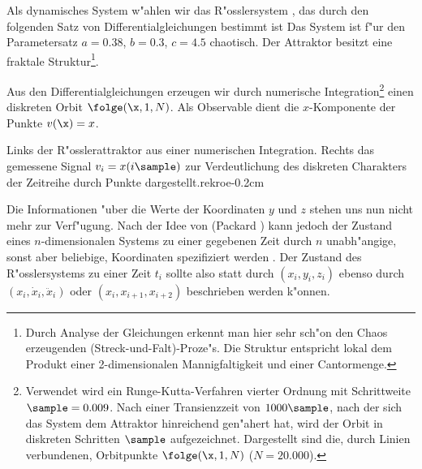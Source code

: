 Als dynamisches System w"ahlen wir das R"osslersystem \cite{Roessler76}, das durch den folgenden Satz von
Differentialgleichungen bestimmt ist
Das System ist f"ur den Parametersatz $a=0.38$, $b=0.3$, $c=4.5$ chaotisch. Der Attraktor besitzt
eine fraktale Struktur\footnote{Durch Analyse der Gleichungen \cite{Peitgen92} erkennt man
hier sehr sch"on den Chaos erzeugenden \metapher(Streck-und-Falt)-Proze"s. Die Struktur
entspricht lokal dem Produkt einer 2-dimensionalen Mannigfaltigkeit und einer Cantormenge.}.

Aus den Differentialgleichungen erzeugen wir durch numerische
Integration\footnote{Verwendet wird ein Runge-Kutta-Verfahren vierter Ordnung mit
Schrittweite $\sample=0.009$. Nach einer Transienzzeit von $1000\sample$, nach der sich das
System dem Attraktor hinreichend gen"ahert hat, wird der Orbit in
diskreten Schritten $\sample$ aufgezeichnet.  Dargestellt sind die, durch Linien
verbundenen, Orbitpunkte $\folge(\x,1,N)$ ($N=20.000$).} einen diskreten Orbit $\folge(\x,1,N)$. 
Als Observable dient die $x$-Komponente der Punkte $v(\x)=x$.


{Links der R"osslerattraktor aus einer numerischen
Integration. Rechts das gemessene Signal $v_i=x(i\sample)$ zur Verdeutlichung des
diskreten Charakters der Zeitreihe durch Punkte dargestellt.}{rekroe}{-0.2cm}

Die Informationen "uber die Werte der Koordinaten $y$ und $z$ stehen uns nun nicht mehr zur
Verf"u\-gung. Nach der Idee von \autor(Packard \etal) kann jedoch der Zustand 
eines $n$-dimensio\-na\-len Systems zu einer gegebenen Zeit durch $n$ unabh"angige, sonst aber
beliebige,  Koordinaten 
spezifiziert werden \cite{packard80}. Der Zustand des R"osslersystems zu einer Zeit $t_i$ sollte
also statt durch $(x_i,y_i,z_i)$ ebenso durch $(x_i,\dot x_i,\ddot x_i)$ oder $(x_i,x_{i+1},x_{i+2})$
beschrieben werden k"onnen.

